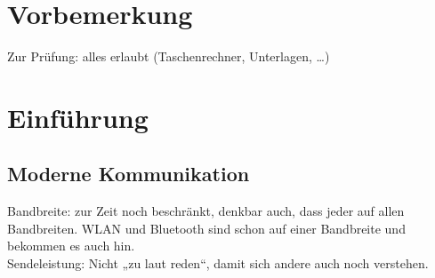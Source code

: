 \newcommand{\customDir}{../}








%
\setlength{\headheight}{10mm}	%



\maketitle
\newpage
\tableofcontents
\newpage

\chapter*{Vorbemerkung}

Zur Prüfung: alles erlaubt (Taschenrechner, Unterlagen, …)

\chapter{Einführung}


\section{Moderne Kommunikation}
Bandbreite: zur Zeit noch beschränkt, denkbar auch, dass jeder auf allen Bandbreiten. WLAN und Bluetooth sind schon auf einer Bandbreite und bekommen es auch hin.\\
Sendeleistung: Nicht „zu laut reden“, damit sich andere auch noch verstehen.

